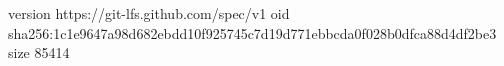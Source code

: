 version https://git-lfs.github.com/spec/v1
oid sha256:1c1e9647a98d682ebdd10f925745c7d19d771ebbcda0f028b0dfca88d4df2be3
size 85414
